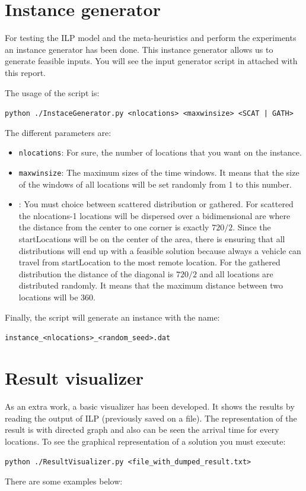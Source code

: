 \documentclass[]{report}
\begin{document}
\newpage

\begin{appendices}
	\chapter{Instance generator}
	For testing the ILP model and the meta-heuristics and perform the experiments an instance generator has been done. This instance generator allows us to generate feasible inputs. You will see the input generator script in attached with this report.
	
	The usage of the script is:
	\begin{center}
		{\tt python ./InstaceGenerator.py <nlocations> <maxwinsize> <SCAT | GATH>}
	\end{center}
	
	The different parameters are:
	\begin{itemize}
		\item {\tt nlocations}: For sure, the number of locations that you want on the instance.
		\item {\tt maxwinsize}: The maximum sizes of the time windows. It means that the size of the windows of all locations will be set randomly from 1 to this number.
		\item {\tt <SCAT | GATH>}: You must choice between scattered distribution or gathered. For scattered the nlocations-1 locations will be dispersed over a bidimensional are where the distance from the center to one corner is exactly $720/2$. Since the startLocations will be on the center of the area, there is ensuring that all distributions will end up with a feasible solution because always a vehicle can travel from startLocation to the most remote location. For the gathered distribution the distance of the diagonal is $720/2$ and all locations are distributed randomly. It means that the maximum distance between two locations will be 360.
	\end{itemize}
	
	Finally, the script will generate an instance with the name:
	\begin{center}
		{\tt instance\_<nlocations>\_<random\_seed>.dat}
	\end{center}
	
	\chapter{Result visualizer}
	
	As an extra work, a basic visualizer has been developed. It shows the results by reading the output of ILP (previously saved on a file). The representation of the result is with directed graph and also can be seen the arrival time for every locations. To see the graphical representation of a solution you must execute:
	\begin{center}
		{\tt python ./ResultVisualizer.py <file\_with\_dumped\_result.txt>}
	\end{center}
	There are some examples below:
	

\end{appendices}
\end{document}
